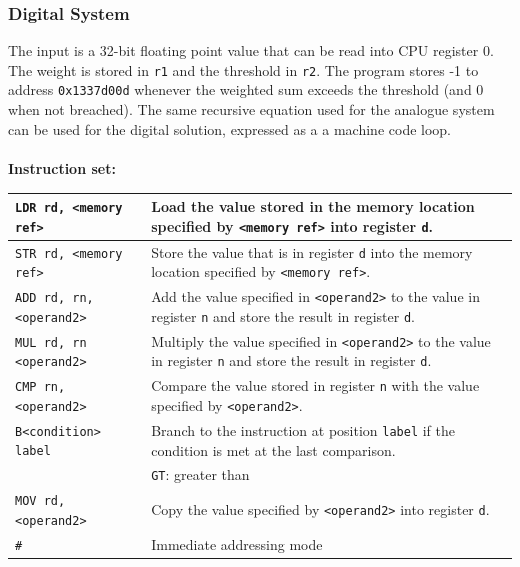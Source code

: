\documentclass[a4paper, 12pt, oneside]{book}
\begin{document}
\subsubsection{Digital System}\label{b}

The input is a 32-bit floating point value that can be read into CPU register 0. The weight is stored in \texttt{r1} and the threshold in \texttt{r2}. The program stores -1 to address \texttt{0x1337d00d} whenever the weighted sum exceeds the threshold (and 0 when not breached). The same recursive equation used for the analogue system can be used for the digital solution, expressed as a a machine code loop.\\
\\
\textbf{Instruction set:}
\begin{table}[H]
  \centering
  \begin{tabularx}{\textwidth}{|X|X|}
    \hline
    \texttt{LDR rd, <memory ref>}   & Load the value stored in the memory location specified by \texttt{<memory ref>} into register \texttt{d}.                            \\
    \hline
    \texttt{STR rd, <memory ref>}   & Store the value that is in register \texttt{d} into the memory location specified by \texttt{<memory ref>}.                          \\
    \hline
    \texttt{ADD rd, rn, <operand2>} & Add the value specified in \texttt{<operand2>} to the value in register \texttt{n} and store the result in register \texttt{d}.      \\
    \hline
    \texttt{MUL rd, rn <operand2>}  & Multiply the value specified in \texttt{<operand2>} to the value in register \texttt{n} and store the result in register \texttt{d}. \\
    \hline
    \texttt{CMP rn, <operand2>}     & Compare the value stored in register \texttt{n} with the value specified by \texttt{<operand2>}.                                     \\
    \hline
    \texttt{B<condition> label}     & Branch to the instruction at position \texttt{label} if the condition is met at the last comparison.                                 \\
                                    & \texttt{GT}: greater than                                                                                                            \\
    \hline
    \texttt{MOV rd, <operand2>}     & Copy the value specified by \texttt{<operand2>} into register \texttt{d}.                                                            \\
    \hline
    \texttt{\#}                     & Immediate addressing mode                                                                                                            \\
    \hline
  \end{tabularx}
\end{table}
\end{document}
